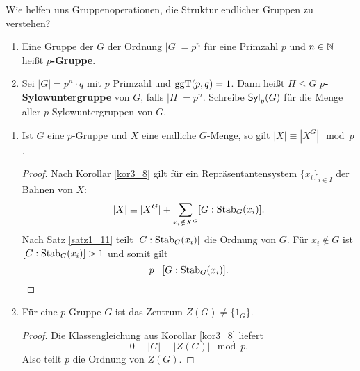 \begin{leftbar}
	{Wie helfen uns Gruppenoperationen, die Struktur endlicher Gruppen zu verstehen?}
\end{leftbar}
\begin{definition}\label{definiton3_10}
	\begin{enumerate}[label=(\alph*)]
		\item Eine Gruppe der $G$ der Ordnung $|G| = p^n$ für eine Primzahl $p$ und $n \in \mathbb{N}$ heißt \textbf{$p$-Gruppe}.
		\item Sei $|G| = p^n \cdot q$ mit $p$ Primzahl und $\mathrm{ggT}(p,q) = 1$. Dann heißt $H \leq G$ \textbf{$p$-Sylowuntergruppe} von $G$, falls $|H| = p^n$. Schreibe $\mathsf{Syl}_p(G)$ für die Menge aller $p$-Sylowuntergruppen von $G$.
	\end{enumerate}
\end{definition}
\begin{rem}\label{rem3_11}
\begin{enumerate}[label=(\roman*)]
	\item 	Ist $G$ eine $p$-Gruppe und $X$ eine endliche $G$-Menge, so gilt $|X| \equiv |X^G| \mod p$.
	\begin{proof}
		Nach Korollar \ref{kor3_8} gilt für ein Repräsentantensystem $\{x_i\}_{i \in I}$ der Bahnen von $X$:
		\[|X| \equiv |X^G| + \sum_{x_i \notin X^G} [G : \mathrm{Stab}_G(x_i)].\]
			Nach Satz \ref{satz1_11} teilt $[G: \mathrm{Stab}_G(x_i) ]$ die Ordnung von $G$. Für $x_i \notin G$ ist $[G : \mathrm{Stab}_G(x_i)] > 1$ und somit gilt
			\[p \mid [G : \mathrm{Stab}_G(x_i)].\]
	\end{proof}
	\item Für eine $p$-Gruppe $G$ ist das Zentrum $Z(G) \neq \{1_G\}$.
	\begin{proof}
		Die Klassengleichung aus Korollar \ref{kor3_8} liefert 
		\[0 \equiv |G| \equiv |Z(G)| \mod p.\]
		Also teilt $p$ die Ordnung von $Z(G)$.
	\end{proof}	
\end{enumerate}
\end{rem}
